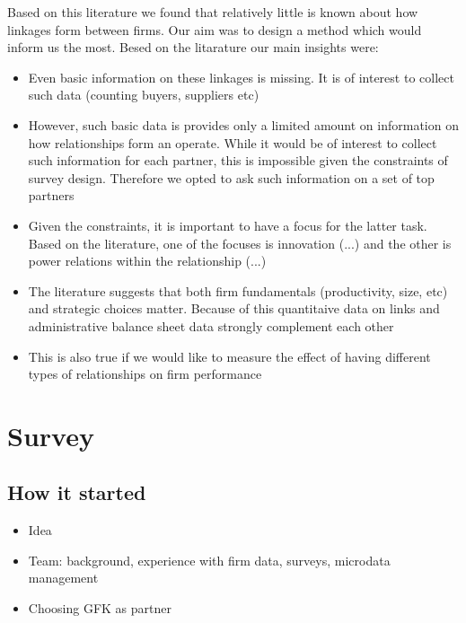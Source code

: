 \documentclass[final, dvipsnames, authoryear,12pt]{elsarticle}
\begin{document}
Based on this literature we found that relatively little is known about how linkages form between firms. Our aim was to design a method which would inform us the most. Besed on the litarature our main insights were:
\begin{itemize}
    \item Even basic information on these linkages is missing. It is of interest to collect such data (counting buyers, suppliers etc)
    \item However, such basic data is provides only a limited amount on information on how relationships form an operate. While it would be of interest to collect such information for each partner, this is impossible given the constraints of survey design. Therefore we opted to ask such information on a set of top partners
    \item Given the constraints, it is important to have a focus for the latter task. Based on the literature, one of the focuses is innovation (...) and the other is power relations within the relationship (...)    
    \item The literature suggests that both firm fundamentals (productivity, size, etc) and strategic choices matter. Because of this quantitaive data on links and administrative balance sheet data strongly complement each other
    \item This is also true if we would like to measure the effect of having different types of relationships on firm performance

    
\end{itemize}{}

\section{ Survey}
\subsection{How it started}


\begin{itemize}
    \item Idea
    \item Team: background, experience with firm data, surveys, microdata management
    \item Choosing GFK as partner
\end{itemize}{}
\end{document}
